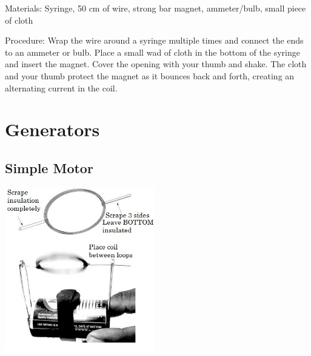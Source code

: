 \begin{multicols}{2}
\begin{description*}
\item[Materials:]{Syringe, 50 cm of wire, strong bar magnet, ammeter/bulb, small piece of cloth}
\item[Procedure:]{Wrap the wire around a syringe multiple times and connect the ends to an ammeter or bulb. Place a small wad of cloth in the bottom of the syringe and insert the magnet. Cover the opening with your thumb and shake. The cloth and your thumb protect the magnet as it bounces back and forth, creating an alternating current in the coil.}
\end{description*}

\columnbreak


\section*{Generators}


\subsection{Simple Motor}

\begin{center}
\includegraphics[width=0.49\textwidth]{./img/simple-motor-final.jpg}
\end{center}


\end{multicols}
